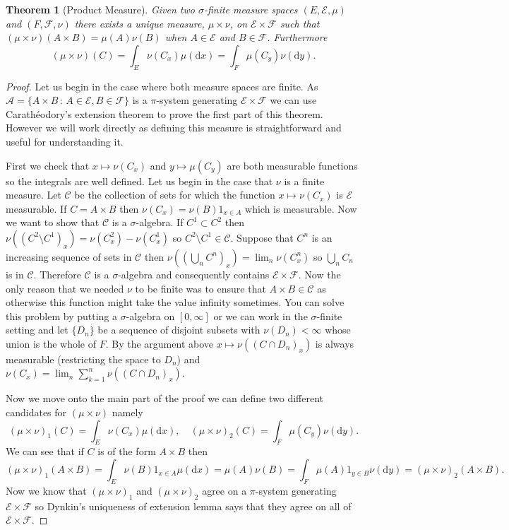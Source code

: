 \documentclass[11pt]{article}
\newtheorem{thm}{Theorem}[section]
\theoremstyle{definition}
\theoremstyle{remark}
\begin{document}
\begin{thm}[Product Measure]
Given two $\sigma$-finite measure spaces $(E, \mathcal{E}, \mu)$ and $(F, \mathcal{F}, \nu)$ there exists a unique measure, $\mu \times \nu$, on $\mathcal{E} \times \mathcal{F}$ such that $(\mu \times \nu)(A \times B) = \mu(A)\nu(B)$ when $A \in \mathcal{E}$ and $B \in \mathcal{F}$. Furthermore
\[ (\mu \times \nu)(C) = \int_E \nu( C_x) \mu(\mathrm{d}x) = \int_F \mu(C_y) \nu(\mathrm{d}y).\]
\end{thm}
\begin{proof}
Let us begin in the case where both measure spaces are finite.
As $\mathcal{A} = \{ A \times B \,:\, A \in \mathcal{E}, B \in \mathcal{F}\}$ is a $\pi$-system generating $\mathcal{E} \times \mathcal{F}$ we can use Carath\'eodory's extension theorem to prove the first part of this theorem. However we will work directly as defining this measure is straightforward and useful for understanding it.

First we check that $x \mapsto \nu(C_x)$ and $y \mapsto \mu(C_y)$ are both measurable functions so the integrals are well defined. Let us begin in the case that $\nu$ is a finite measure. Let $\mathcal{C}$ be the collection of sets for which the function $x \mapsto \nu(C_x)$ is $\mathcal{E}$ measurable. If $C = A \times B$ then $\nu(C_x) = \nu(B)1_{x \in A}$ which is measurable. Now we want to show that $\mathcal{C}$ is a $\sigma$-algebra. If $C^1 \subset C^2$ then $\nu((C^2 \setminus C^1)_x) = \nu(C^2_x) - \nu(C^1_x)$ so $C^2 \setminus C^1 \in \mathcal{C}$. Suppose that $C^n$ is an increasing sequence of sets in $\mathcal{C}$ then $\nu\left( \left(\bigcup_n C^n\right)_x\right) = \lim_n \nu \left( C^n_x\right)$ so $\bigcup_n C_n$ is in $\mathcal{C}$. Therefore $\mathcal{C}$ is a $\sigma$-algebra and consequently contains $\mathcal{E} \times \mathcal{F}$. Now the only reason that we needed $\nu$ to be finite was to ensure that $A \times B \in \mathcal{C}$ as otherwise this function might take the value infinity sometimes. You can solve this problem by putting a $\sigma$-algebra on $[0,\infty]$ or we can work in the $\sigma$-finite setting and let $\{D_n\}$ be a sequence of disjoint subsets with $\nu(D_n)< \infty$ whose union is the whole of $F$. By the argument above $x \mapsto \nu((C\cap D_n)_x)$ is always measurable (restricting the space to $D_n$) and $\nu(C_x) = \lim_n \sum_{k=1}^n \nu((C \cap D_n)_x)$.

Now we move onto the main part of the proof we can define two different candidates for $(\mu \times \nu)$ namely
\[ (\mu \times \nu)_1(C) = \int_E \nu(C_x) \mu(\mathrm{d}x), \quad (\mu \times \nu)_2(C) = \int_F \mu(C_y) \nu(\mathrm{d}y). \] We can see that if $C$ is of the form $A \times B$ then
\[ (\mu \times \nu)_1(A \times B) = \int_E \nu(B)1_{x \in A} \mu(\mathrm{d}x) = \mu(A) \nu(B) = \int_F \mu(A)1_{y \in B} \nu(\mathrm{d}y) = (\mu \times \nu)_2 (A \times B). \] Now we know that $(\mu \times \nu)_1$ and $(\mu \times \nu)_2$ agree on a $\pi$-system generating $\mathcal{E} \times \mathcal{F}$ so Dynkin's uniqueness of extension lemma says that they agree on all of $\mathcal{E} \times \mathcal{F}$. 


\end{proof}
\end{document}
